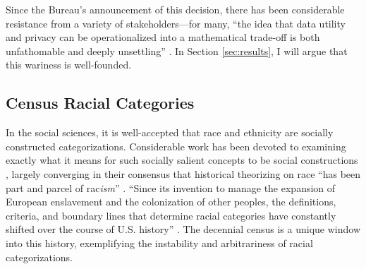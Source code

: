 Since the Bureau's announcement of this decision, there has been considerable resistance from a variety of stakeholders---for many, ``the idea that data utility and privacy can be operationalized into a mathematical trade-off is both unfathomable and deeply unsettling'' \cite{boyd_balancing_2020}. In Section \ref{sec:results}, I will argue that this wariness is well-founded.


\subsection{Census Racial Categories}\label{sec:race-cats}

In the social sciences, it is well-accepted that race and ethnicity are socially constructed categorizations. Considerable work has been devoted to examining exactly what it means for such socially salient concepts to be social constructions \cite{lee2009race, omi_racial_2014}, largely converging in their consensus that historical theorizing on race ``has been part and parcel of rac\textit{ism}'' \cite{morning2011nature}. ``Since its invention to manage the expansion of European enslavement and the colonization of other peoples, the definitions, criteria, and boundary lines that determine racial categories have constantly shifted over the course of U.S. history'' \cite{roberts2011fatal}. The decennial census is a unique window into this history, exemplifying the instability and arbitrariness of racial categorizations. 

